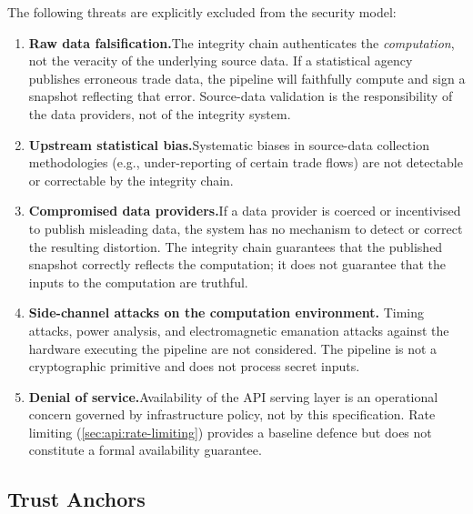 The following threats are explicitly excluded from the security model:

\begin{enumerate}
  \item \textbf{Raw data falsification.}\enspace  The integrity chain
    authenticates the \emph{computation}, not the veracity of the
    underlying source data.  If a statistical agency publishes erroneous
    trade data, the \ISI pipeline will faithfully compute and sign a
    snapshot reflecting that error.  Source-data validation is the
    responsibility of the data providers, not of the \ISI integrity system.

  \item \textbf{Upstream statistical bias.}\enspace  Systematic biases in
    source-data collection methodologies (e.g., under-reporting of certain
    trade flows) are not detectable or correctable by the integrity chain.

  \item \textbf{Compromised data providers.}\enspace  If a data provider is
    coerced or incentivised to publish misleading data, the \ISI system has
    no mechanism to detect or correct the resulting distortion.  The
    integrity chain guarantees that the published snapshot correctly reflects
    the computation; it does not guarantee that the inputs to the
    computation are truthful.

  \item \textbf{Side-channel attacks on the computation environment.}\enspace
    Timing attacks, power analysis, and electromagnetic emanation attacks
    against the hardware executing the pipeline are not considered.  The
    pipeline is not a cryptographic primitive and does not process secret
    inputs.

  \item \textbf{Denial of service.}\enspace  Availability of the API
    serving layer is an operational concern governed by infrastructure
    policy, not by this specification.  Rate limiting
    (\cref{sec:api:rate-limiting}) provides a baseline defence but does not
    constitute a formal availability guarantee.
\end{enumerate}

\subsection{Trust Anchors}\label{sec:threat:trust-anchors}

